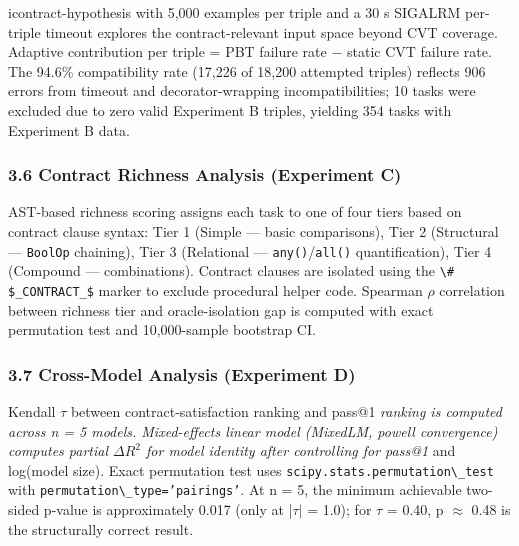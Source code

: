 icontract-hypothesis with 5,000 examples per triple and a 30 s SIGALRM per-triple timeout explores the contract-relevant input space beyond CVT coverage. Adaptive contribution per triple = PBT failure rate $-$ static CVT failure rate. The 94.6\% compatibility rate (17,226 of 18,200 attempted triples) reflects 906 errors from timeout and decorator-wrapping incompatibilities; 10 tasks were excluded due to zero valid Experiment B triples, yielding 354 tasks with Experiment B data.

\subsubsection{3.6 Contract Richness Analysis (Experiment C)}

AST-based richness scoring assigns each task to one of four tiers based on contract clause syntax: Tier 1 (Simple --- basic comparisons), Tier 2 (Structural --- \texttt{BoolOp} chaining), Tier 3 (Relational --- \texttt{any()}/\texttt{all()} quantification), Tier 4 (Compound --- combinations). Contract clauses are isolated using the \texttt{\textbackslash\# \$\_CONTRACT\_\$} marker to exclude procedural helper code. Spearman $\rho$ correlation between richness tier and oracle-isolation gap is computed with exact permutation test and 10,000-sample bootstrap CI.

\subsubsection{3.7 Cross-Model Analysis (Experiment D)}

Kendall $\tau$ between contract-satisfaction ranking and pass@1\textit{ ranking is computed across n = 5 models. Mixed-effects linear model (MixedLM, powell convergence) computes partial $\Delta R^2$ for model identity after controlling for pass@1} and log(model size). Exact permutation test uses \texttt{scipy.stats.permutation\textbackslash \_test} with \texttt{permutation\textbackslash \_type='pairings'}. At n = 5, the minimum achievable two-sided p-value is approximately 0.017 (only at |$\tau |$ = 1.0); for $\tau$ = 0.40, p $\approx$ 0.48 is the structurally correct result.

